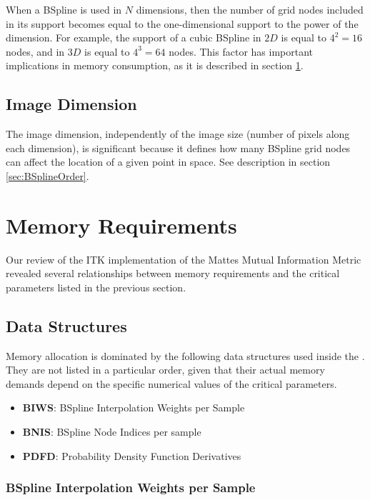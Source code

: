 \documentclass{InsightArticle}
\begin{document}
When a BSpline is used in $N$ dimensions, then the number of grid nodes
included in its support becomes equal to the one-dimensional support to the
power of the dimension. For example, the support of a cubic BSpline in $2D$ is
equal to $4^2=16$ nodes, and in $3D$ is equal to $4^3=64$ nodes. This factor
has important implications in memory consumption, as it is described in section
\ref{sec:MemoryRequirements}.

\subsection{Image Dimension}

The image dimension, independently of the image size (number of pixels along
each dimension), is significant because it defines how many BSpline grid nodes
can affect the location of a given point in space. See description in section
\ref{sec:BSplineOrder}.

\section{Memory Requirements}
\label{sec:MemoryRequirements}

Our review of the ITK implementation of the Mattes Mutual Information Metric
revealed several relationships between memory requirements and the critical
parameters listed in the previous section.

\subsection{Data Structures}

Memory allocation is dominated by the following data structures used inside the
. They are not listed in a 
particular order, given that their actual memory demands depend on the specific
numerical values of the critical parameters.


\begin{itemize}
\item \textbf{BIWS}: BSpline Interpolation Weights per Sample
\item \textbf{BNIS}: BSpline Node Indices per sample
\item \textbf{PDFD}: Probability Density Function Derivatives
\end{itemize}


\subsubsection{BSpline Interpolation Weights per Sample}
\end{document}
